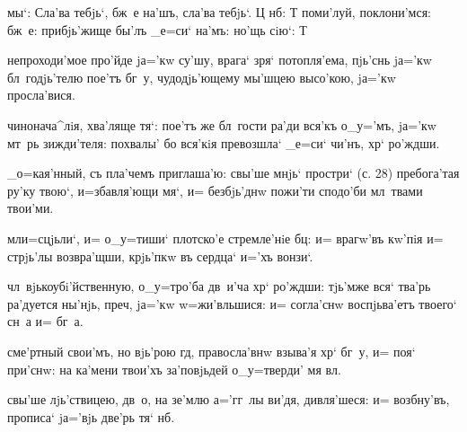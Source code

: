 
мы`: Сла'ва тебjь`, бж~е на'шъ, сла'ва тебjь`. Ц%
нб: Т%
поми'луй, %
поклони'мся: %
бж~е: %
прибjь'жище бы'лъ _е=си` на'мъ: %
но'щь сiю`: Т%


непроходи'мое про'йде jа='кw су'шу, врага` зря` 
потопля'ема, пjь'снь jа='кw бл~годjь'телю пое'тъ бг~у, 
чудодjь'ющему мы'шцею высо'кою, jа='кw просла'вися.


чинонача^лiя, хва'ляще тя`: пое'тъ же бл~гости ра'ди 
вся'къ о_у='мъ, jа='кw мт~рь зижди'теля: похвалы' бо 
вся'кiя превозшла` _е=си` чи'нъ, хр` ро'ждши.

_о=кая'нный, съ пла'чемъ приглаша'ю: свы'ше мнjь` 
простри` (с. 28) пребога'тая ру'ку твою`, и=збавля'ющи 
мя`, и= безбjь'днw пожи'ти сподо'би мл~твами твои'ми.

мл и=сцjьли`, и= о_у=тиши` плотско'е стремле'нiе 
бц: и= врагw'въ кw'пiя и= стрjь'лы возвра'щши, 
крjь'пкw въ сердца` и='хъ вонзи`.

чл~вjькоубi'йственную, о_у=тро'ба дв~и'ча хр` 
ро'ждши: тjь'мже вся` тва'рь ра'дуется ны'нjь, преч, 
jа='кw w=жи'вльшися: и= согла'снw воспjьва'етъ твоего` 
сн~а и= бг~а.


сме'ртный свои'мъ, но вjь'рою гд, правосла'внw 
взыва'я хр` бг~у, и= поя` при'снw: на ка'мени твои'хъ 
за'повjьдей о_у=тверди' мя вл.

свы'ше лjь'ствицею, дв~о, на зе'млю а='гг~лы ви'дя, 
дивля'шеся: и= возбну'въ, прописа` jа='вjь две'рь тя` 
нб.

